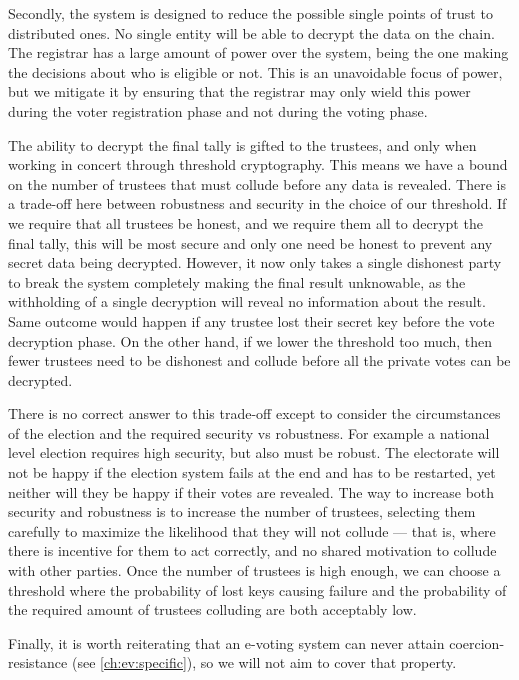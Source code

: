 Secondly, the system is designed to reduce the possible single points of trust to distributed ones. No single entity will be able to decrypt the data on the chain. The registrar has a large amount of power over the system, being the one making the decisions about who is eligible or not. This is an unavoidable focus of power, but we mitigate it by ensuring that the registrar may only wield this power during the voter registration phase and not during the voting phase.

The ability to decrypt the final tally is gifted to the trustees, and only when working in concert through threshold cryptography. This means we have a bound on the number of trustees that must collude before any data is revealed. There is a trade-off here between robustness and security in the choice of our threshold. If we require that all trustees be honest, and we require them all to decrypt the final tally, this will be most secure and only one need be honest to prevent any secret data being decrypted. However, it now only takes a single dishonest party to break the system completely making the final result unknowable, as the withholding of a single decryption will reveal no information about the result. Same outcome would happen if any trustee lost their secret key before the vote decryption phase. On the other hand, if we lower the threshold too much, then fewer trustees need to be dishonest and collude before all the private votes can be decrypted.

There is no correct answer to this trade-off except to consider the circumstances of the election and the required security vs robustness. For example a national level election requires high security, but also must be robust. The electorate will not be happy if the election system fails at the end and has to be restarted, yet neither will they be happy if their votes are revealed. The way to increase both security and robustness is to increase the number of trustees, selecting them carefully to maximize the likelihood that they will not collude --- that is, where there is incentive for them to act correctly, and no shared motivation to collude with other parties. Once the number of trustees is high enough, we can choose a threshold where the probability of lost keys causing failure and the probability of the required amount of trustees colluding are both acceptably low.

Finally, it is worth reiterating that an e-voting system can never attain coercion-resistance (see \autoref{ch:ev:specific}), so we will not aim to cover that property.

